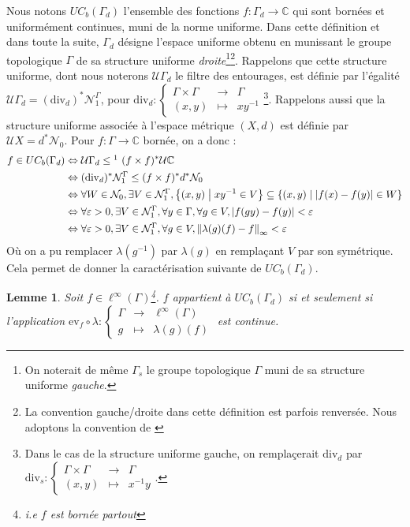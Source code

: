 \documentclass[a4paper,12pt]{article}
\newtheorem{lemma}[theorem]{Lemme}
\newcommand{\C}{\mathbb{C}}
\newcommand{\ev}{\mathrm{ev}}
\newcommand{\norm}[1]{\left\Vert #1\right\Vert}
\newcommand{\abs}[1]{\left\vert#1\right\vert}
\newcommand{\set}[1]{\left\{ #1 \right\}}
\newcommand\fundef[3]{#1: \left\{\begin{array}{ccc}#2\\#3\end{array}\right.}
\newcommand{\tq}{\;\middle|\;}
\newcommand{\ssi}{si et seulement si }
\newcommand{\inv}{^{-1}}
\newcommand{\comp}{\circ}
\newcommand{\nhds}{\mathcal{N}}
\renewcommand{\iff}{\Leftrightarrow}
\newcommand{\divop}{\mathrm{div}}
\begin{document}
Nous notons $UC_b(\Gamma_d)$ l'ensemble des fonctions $f:\Gamma_d\to\C$ qui sont bornées et uniformément 
continues, muni de la norme uniforme. Dans cette définition et dans toute la suite, $\Gamma_d$ désigne l'espace uniforme obtenu 
en munissant le groupe topologique $\Gamma$ de sa structure uniforme \emph{droite}\footnote{On noterait de même $\Gamma_s$
le groupe topologique $\Gamma$ muni de sa structure uniforme \emph{gauche}.}\footnote{La convention \og{}gauche/droite\fg{} 
dans cette définition est parfois renversée. Nous adoptons la convention de \cite[Bourbaki, \textit{Topologie Générale}]{bourbaki2007topologie}}.
Rappelons que cette structure uniforme, dont nous noterons $\mathcal{U}\Gamma_d$ le filtre des entourages,
est définie par l'égalité $\mathcal{U}\Gamma_d=(\divop_d)^*\nhds_1^\Gamma$, pour 
$\fundef{\divop_d}{\Gamma\times\Gamma&\to&\Gamma}{(x, y)&\mapsto&x y\inv}$\footnote{Dans le cas de la structure 
uniforme gauche, on remplaçerait $\divop_d$ par $\fundef{\divop_s}{\Gamma\times\Gamma&\to&\Gamma}{(x, y)&\mapsto&x\inv y}$.}.
Rappelons aussi que la structure uniforme associée à l'espace métrique $(X, d)$ est définie par 
$\mathcal{U}X = d^*\nhds_0$. 
Pour $f:\Gamma\to\C$ bornée, on a donc : 
\begin{align}
    f\in UC_b(\Gamma_d)
        &\iff \mathcal{U}\Gamma_d \le\footnotemark\ (f\times f)^*\mathcal{U}\C \nonumber \\
        &\iff (\divop_d)^*\nhds_1^\Gamma \le (f\times f)^*d^*\nhds_0 \nonumber \\
        &\iff \forall W\in\nhds_0, \exists V\in\nhds_1^\Gamma, \set{(x, y)\tq x y\inv\in V} \subseteq \set{(x, y)\tq \abs{f(x)-f(y)}\in W} \nonumber \\
        &\iff \forall \varepsilon>0, \exists V\in\nhds_1^\Gamma, \forall y\in\Gamma, \forall g\in V, \abs{f(gy)-f(y)} < \varepsilon \nonumber \\
        &\iff \forall \varepsilon>0, \exists V\in\nhds_1^\Gamma, \forall g\in V, \norm{\lambda(g)(f) - f}_\infty < \varepsilon \label{UCB_explicit_cara}
\end{align}
Où on a pu remplacer $\lambda(g\inv)$ par $\lambda(g)$ en remplaçant $V$ par son symétrique. Cela permet de donner la caractérisation suivante de $UC_b(\Gamma_d)$.

\begin{lemma}\label{UCB_iff_translate}
    Soit $f\in\ell^\infty(\Gamma)$\footnote{i.e $f$ est bornée \emph{partout}}. $f$ appartient à $UC_b(\Gamma_d)$ \ssi l'application 
    $\fundef{\ev_f\comp\lambda}{\Gamma&\to&\ell^\infty(\Gamma)}{g&\mapsto&\lambda(g)(f)}$
    est continue.
\end{lemma}
\end{document}
